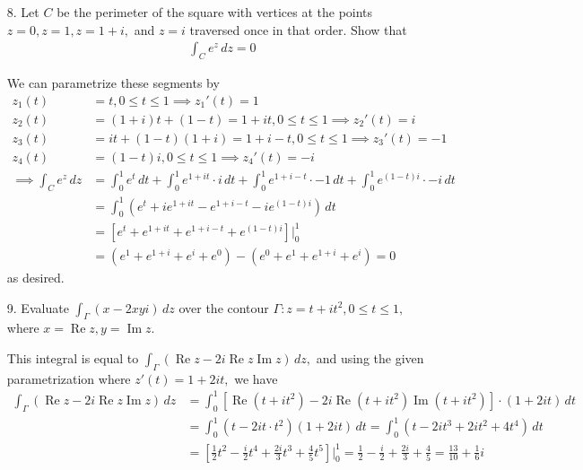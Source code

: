 \documentclass{article}
\DeclareMathOperator{\re}{Re}
\DeclareMathOperator{\im}{Im}
\begin{document}
\begin{itemize}
	\item[8.] Let $C$ be the perimeter of the square with vertices at the points $z=0, z=1, z=1+i,$ and $z=i$ traversed once in that order. Show that
		\begin{align*}
			\int_C e^z\, dz=0
		\end{align*}
		\begin{soln}
			We can parametrize these segments by
			\begin{align*}
				z_1(t) &= t, 0\le t\le 1 \implies z_1'(t) = 1 \\
				z_2(t) &= (1+i)t + (1-t) = 1+it, 0\le t\le 1 \implies z_2'(t) = i \\
				z_3(t) &= it + (1-t)(1+i) = 1+i-t, 0\le t\le 1 \implies z_3'(t) = -1\\
				z_4(t) &= (1-t)i, 0\le t\le 1 \implies z_4'(t)=-i\\
				\implies\int_C e^{z}\, dz &= \int_0^1 e^t\, dt + \int_0^1 e^{1+it}\cdot i\, dt + \int_0^1 e^{1+i-t}\cdot -1\, dt + \int_0^1 e^{(1-t)i}\cdot -i\, dt \\
				&= \int_0^1 \left( e^t + ie^{1+it} - e^{1+i-t} - ie^{(1-t)i} \right)\, dt \\
				&= \left[ e^t + e^{1+it} + e^{1+i-t} + e^{(1-t)i} \right]\bigg|_0^1 \\
				&= \left( e^1 + e^{1+i} + e^{i} + e^{0} \right) - \left( e^0 + e^1 + e^{1+i} + e^{i} \right) = 0
			\end{align*}
			as desired.
		\end{soln}

	\item[9.] Evaluate $\int_\Gamma (x-2xyi)\, dz$ over the contour $\Gamma: z=t+it^2, 0\le t\le 1,$ where $x=\re z, y=\im z.$
		\begin{soln}
			This integral is equal to $\int_\Gamma(\re z - 2i\re z\im z )\, dz,$ and using the given parametrization where $z'(t)=1+2it,$ we have
			\begin{align*}
				\int_\Gamma\left( \re z - 2i\re z\im z \right)\, dz &= \int_0^1 \left[ \re(t+it^2) - 2i\re(t+it^2)\im(t+it^2) \right]\cdot (1+2it)\, dt \\
				&= \int_0^1 \left( t - 2it\cdot t^2 \right)(1+2it)\, dt = \int_0^1 \left( t-2it^3+2it^2+4t^4 \right)\, dt \\
				&= \left[ \frac{1}{2}t^2 - \frac{i}{2}t^4 + \frac{2i}{3} t^3 + \frac{4}{5} t^5 \right]\bigg|_0^1 = \frac{1}{2} - \frac{i}{2} + \frac{2i}{3} + \frac{4}{5} = \frac{13}{10} + \frac{1}{6}i
			\end{align*}
		\end{soln}


\end{itemize}
\end{document}
